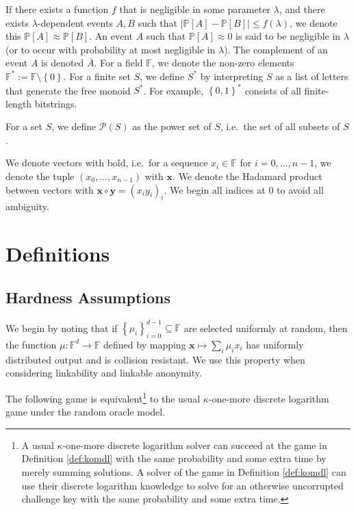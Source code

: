 \documentclass{llncs}
\begin{document}
If there exists a function $f$ that is negligible in some parameter $\lambda$, and there exists $\lambda$-dependent events $A, B$ such that $\left|\mathbb{P}\left[A\right] - \mathbb{P}\left[B\right]\right| \leq f(\lambda)$, we denote this $\mathbb{P}\left[A\right] \approx \mathbb{P}\left[B\right]$. An event $A$ such that $\mathbb{P}\left[A\right] \approx 0$ is said to be negligible in $\lambda$ (or to occur with probability at most negligible in $\lambda$). The complement of an event $A$ is denoted $\overline{A}$. For a field $\mathbb{F}$, we denote the non-zero elements $\mathbb{F}^* := \mathbb{F}\setminus \left\{0\right\}$. For a finite set $S$, we define $S^*$ by interpreting $S$ as a list of letters that generate the free monoid $S^*$. For example, $\left\{0,1\right\}^*$ consists of all finite-length bitstrings.

For a set $S$, we define $\mathcal{P}(S)$ as the power set of $S$, i.e.\ the set of all subsets of $S$.

We denote vectors with bold, i.e.\ for a sequence $x_i \in \mathbb{F}$ for $i = 0, \ldots, n-1$, we denote the tuple $(x_0, \ldots, x_{n-1})$ with $\textbf{x}$. We denote the Hadamard product between vectors with $\textbf{x} \circ \textbf{y} = (x_i y_i)_i$. We begin all indices at $0$ to avoid all ambiguity.


\section{Definitions}

\subsection{Hardness Assumptions}\label{sec:hardness}

We begin by noting that if $\left\{\mu_i\right\}_{i=0}^{d-1} \subseteq \mathbb{F}$ are selected uniformly at random, then the function $\mu: \mathbb{F}^d \to \mathbb{F}$ defined by mapping $\textbf{x} \mapsto \sum_i \mu_i x_i$ has uniformly distributed output and is collision resistant. We use this property when considering linkability and linkable anonymity.

The following game is equivalent\footnote{A usual $\kappa$-one-more discrete logarithm solver can succeed at the game in Definition \ref{def:komdl} with the same probability and some extra time by merely summing solutions. A solver of the game in Definition \ref{def:komdl} can use their discrete logarithm knowledge to solve for an otherwise uncorrupted challenge key with the same probability and some extra time.} to the usual $\kappa$-one-more discrete logarithm game under the random oracle model.
\end{document}

